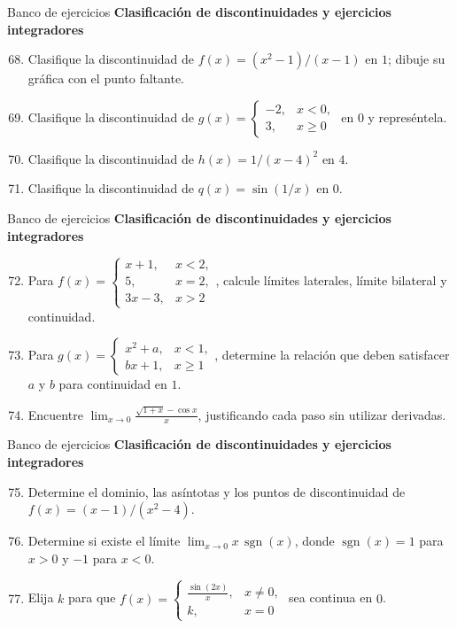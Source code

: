 \documentclass[12pt,aspectratio=169]{beamer}
\begin{document}
\begin{frame}[t,allowframebreaks]{Banco de ejercicios}
\small
\noindent \textbf{Clasificación de discontinuidades y ejercicios integradores}\par\smallskip
\begin{enumerate}\setcounter{enumi}{67}
\item Clasifique la discontinuidad de $f(x)=(x^2-1)/(x-1)$ en $1$; dibuje su gráfica con el punto faltante.
\item Clasifique la discontinuidad de $g(x)=\begin{cases}-2,&x<0,\\3,&x\ge0\end{cases}$ en $0$ y represéntela.
\item Clasifique la discontinuidad de $h(x)=1/(x-4)^2$ en $4$.
\item Clasifique la discontinuidad de $q(x)=\sin(1/x)$ en $0$.
\end{enumerate}
\end{frame}


\begin{frame}[t,allowframebreaks]{Banco de ejercicios}
\small
\noindent \textbf{Clasificación de discontinuidades y ejercicios integradores}\par\smallskip
\begin{enumerate}\setcounter{enumi}{71}
\item Para $f(x)=\begin{cases}x+1,&x<2,\\5,&x=2,\\3x-3,&x>2\end{cases}$, calcule límites laterales, límite bilateral y continuidad.
\item Para $g(x)=\begin{cases}x^2+a,&x<1,\\bx+1,&x\ge1\end{cases}$, determine la relación que deben satisfacer $a$ y $b$ para continuidad en $1$.
\item Encuentre $\lim_{x\to0}\frac{\sqrt{1+x}-\cos x}{x}$, justificando cada paso sin utilizar derivadas.
\end{enumerate}
\end{frame}


\begin{frame}[t,allowframebreaks]{Banco de ejercicios}
\small
\noindent \textbf{Clasificación de discontinuidades y ejercicios integradores}\par\smallskip
\begin{enumerate}\setcounter{enumi}{74}
\item Determine el dominio, las asíntotas y los puntos de discontinuidad de $f(x)=(x-1)/(x^2-4)$.
\item Determine si existe el límite $\lim_{x\to0} x\,\operatorname{sgn}(x)$, donde $\operatorname{sgn}(x)=1$ para $x>0$ y $-1$ para $x<0$.
\item Elija $k$ para que $f(x)=\begin{cases}\frac{\sin(2x)}{x},&x\ne0,\\k,&x=0\end{cases}$ sea continua en $0$.
\end{enumerate}
\end{frame}
\end{document}
